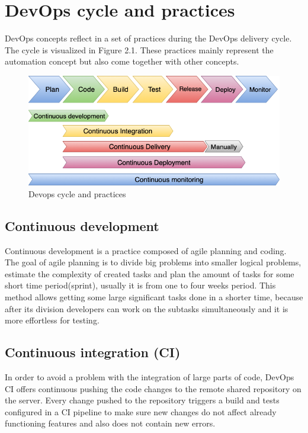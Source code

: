 \section{DevOps cycle and practices} DevOps concepts reflect in a set of practices during the DevOps delivery cycle. The cycle is visualized in Figure 2.1. These practices mainly represent the automation concept but also come together with other concepts.\cite{devops-principles}

\begin{figure}[h]
\centering
\includegraphics[scale=0.56]{../png/devops.png}
\caption{Devops cycle and practices}\label{picture:devops}
\end{figure}

\subsection{Continuous development} Continuous development is a practice composed of agile planning and coding. The goal of agile planning  is to divide big problems into smaller logical problems, estimate the complexity of created tasks and plan the amount of tasks for some short time period(sprint), usually it is from one to four weeks period. This method allows getting some large significant tasks done in a shorter time, because after its division developers can work on the subtasks simultaneously and it is more effortless for testing.

\subsection{Continuous integration (CI)} In order to avoid a problem with the integration of large parts of code, DevOps CI offers continuous pushing the code changes to the remote shared repository on the server. Every change pushed to the repository triggers a build and tests configured in a CI pipeline to make sure new changes do not affect already functioning features and also does not contain new errors.

